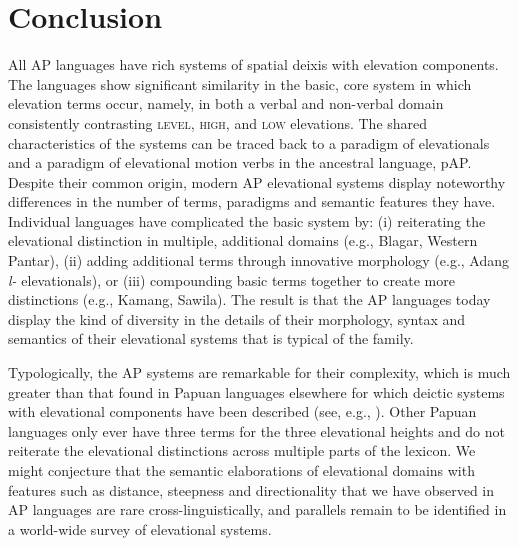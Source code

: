 \section{Conclusion}
All AP languages have rich systems of spatial deixis with elevation components. The languages show significant similarity in the basic, core system in which elevation terms occur, namely, in both a verbal and non-verbal domain consistently contrasting \textsc{level,} \textsc{high,} and \textsc{low} elevations. The shared characteristics of the systems can be traced back to a paradigm of elevationals and a paradigm of elevational motion verbs in the ancestral language, pAP. Despite their common origin, modern AP elevational systems display noteworthy differences in the number of terms, paradigms and semantic features they have. Individual languages have complicated the basic system by: (i) reiterating the elevational distinction in multiple, additional domains (e.g., Blagar, Western Pantar), (ii) adding additional terms through innovative morphology (e.g., Adang \textit{l}\textit{{\textepsilon}}\textit{{}-} elevationals), or (iii) compounding basic terms together to create more distinctions (e.g., Kamang, Sawila). The result is that the AP languages today display the kind of diversity in the details of their morphology, syntax and semantics of their elevational systems that is typical of the family.

Typologically, the AP systems are remarkable for their complexity, which is much greater than that found in Papuan languages elsewhere for which deictic systems with elevational components have been described (see, e.g., \citet{Heeschen1982,Heeschen1987}). Other Papuan languages only ever have three terms for the three elevational heights and do not reiterate the elevational distinctions across multiple parts of the lexicon. We might conjecture that the semantic elaborations of elevational domains with features such as distance, steepness and directionality that we have observed in AP languages are rare cross-linguistically, and parallels remain to be identified in a world-wide survey of elevational systems.

